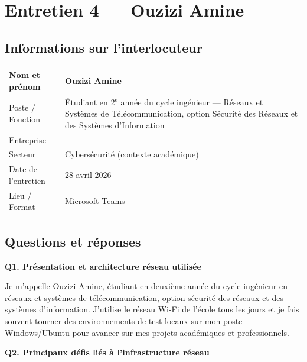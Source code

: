 \documentclass[12pt,a4paper]{article}
\begin{document}
\clearpage

\section{Entretien 4 --- Ouzizi Amine}

\subsection*{Informations sur l'interlocuteur}

\begin{tabular}{@{}B{4cm} L{10.5cm}@{}}
  \hline
  Nom et pr\'{e}nom      & Ouzizi Amine \\
  \hline
  Poste / Fonction   & \'{E}tudiant en 2$^{e}$ ann\'{e}e du cycle ing\'{e}nieur --- R\'{e}seaux et Syst\`{e}mes
                       de T\'{e}l\'{e}communication, option S\'{e}curit\'{e} des R\'{e}seaux et des
                       Syst\`{e}mes d'Information \\
  \hline
  Entreprise         & --- \\
  \hline
  Secteur            & Cybers\'{e}curit\'{e} (contexte acad\'{e}mique) \\
  \hline
  Date de l'entretien & 28 avril 2026 \\
  \hline
  Lieu / Format      & Microsoft Teams \\
  \hline
\end{tabular}

\subsection*{Questions et r\'{e}ponses}

\textbf{Q1. Pr\'{e}sentation et architecture r\'{e}seau utilis\'{e}e}

Je m'appelle Ouzizi Amine, \'{e}tudiant en deuxi\`{e}me ann\'{e}e du cycle ing\'{e}nieur en r\'{e}seaux et
syst\`{e}mes de t\'{e}l\'{e}communication, option s\'{e}curit\'{e} des r\'{e}seaux et des syst\`{e}mes d'information.
J'utilise le r\'{e}seau Wi-Fi de l'\'{e}cole tous les jours et je fais souvent tourner des environnements
de test locaux sur mon poste Windows/Ubuntu pour avancer sur mes projets acad\'{e}miques et
professionnels.

\bigskip
\textbf{Q2. Principaux d\'{e}fis li\'{e}s \`{a} l'infrastructure r\'{e}seau}
\end{document}
